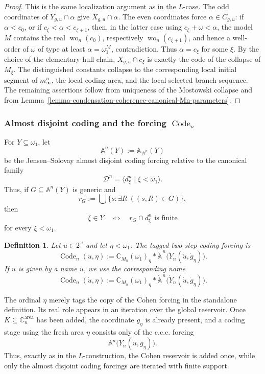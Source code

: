\documentclass[a4paper,11pt]{article}
\newtheorem{definition}[theorem]{Definition}
\newcommand{\forceC}{\mathbb{C}}
\begin{document}
\begin{proof}
This is the same localization argument as in the $L$-case.  The odd
coordinates of $Y_{g,u}\cap\alpha$ give $X_{g,u}\cap\alpha$.  The even
coordinates force $\alpha\in C_{g,u}$: if $\alpha<c_0$, or if
$c_\xi<\alpha<c_{\xi+1}$, then, in the latter case using
$c_\xi+\omega<\alpha$, the model $M$ contains the real
$\operatorname{wo}_n(c_0)$, respectively $\operatorname{wo}_n(c_{\xi+1})$,
and hence a well-order of $\omega$ of type at least
$\alpha=\omega_1^M$, contradiction.  Thus $\alpha=c_\xi$ for some $\xi$.
By the choice of the elementary hull chain, $X_{g,u}\cap c_\xi$ is exactly
the code of the collapse of $M_\xi$.  The distinguished constants collapse to
the corresponding local initial segment of $m^n_\infty$, the local coding
area, and the local selected branch sequence.  The remaining assertions follow
from uniqueness of the Mostowski collapse and from
Lemma~\ref{lemma-condensation-coherence-canonical-Mn-parameters}.
\end{proof}

\subsubsection*{Almost disjoint coding and the forcing
$\operatorname{Code}_n$}

For $Y\subseteq\omega_1$, let
\[
   \mathbb A^n(Y)
   :=\mathbb A_{\mathcal D^n}(Y)
\]
be the Jensen--Solovay almost disjoint coding forcing relative to the
canonical family
\[
   \mathcal D^n=\langle d^n_\xi\mid\xi<\omega_1\rangle.
\]
Thus, if $G\subseteq\mathbb A^n(Y)$ is generic and
\[
   r_G:=\bigcup\{s:\exists R\ ((s,R)\in G)\},
\]
then
\[
   \xi\in Y
   \quad\Longleftrightarrow\quad
   r_G\cap d^n_\xi\text{ is finite}
\]
for every $\xi<\omega_1$.

\begin{definition}
\label{definition-Mn-coding-forcing}
Let $u\in2^\omega$ and let $\eta<\omega_1$.  The tagged two-step coding
forcing is
\[
   \operatorname{Code}_n(u,\eta)
   :=
   \mathbb C_{M_n}(\omega_1)_\eta
   *\dot{\mathbb A}^{\,n}
      \bigl(\dot Y_n(\check u,\dot g_\eta)\bigr).
\]
If $u$ is given by a name $\dot u$, we use the corresponding name
\[
   \operatorname{Code}_n(\dot u,\eta)
   :=
   \mathbb C_{M_n}(\omega_1)_\eta
   *\dot{\mathbb A}^{\,n}
      \bigl(\dot Y_n(\dot u,\dot g_\eta)\bigr).
\]
\end{definition}

The ordinal $\eta$ merely tags the copy of the Cohen forcing in the standalone
definition.  Its real role appears in an iteration over the global reservoir.
Once $K\subseteq\forceC^{\mathrm{area}}_n$ has been added, the coordinate
$g_\eta$ is already present, and a coding stage using the fresh area $\eta$
consists only of the c.c.c. forcing
\[
   \mathbb A^n\bigl(Y_n(u,g_\eta)\bigr).
\]
Thus, exactly as in the $L$-construction, the Cohen reservoir is added once,
while only the almost disjoint coding forcings are iterated with finite
support.
\end{document}
